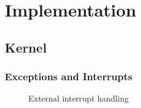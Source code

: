 \chapter{Implementation}




\section{Kernel}





\subsection{Exceptions and Interrupts}\label{subsec:excp-and-ints}
\begin{figure}[h]
	\centering
	
	\caption{External interrupt handling}
	\label{fig:external-interrupt}
\end{figure}





